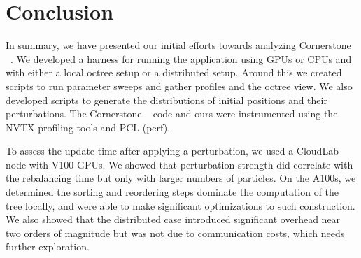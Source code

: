 \section{Conclusion}
\label{sec:conclusion}

In summary, we have presented our initial efforts towards analyzing Cornerstone ~\cite{cornerstone}. We developed a harness for running the application using GPUs or CPUs and with either a local octree setup or a distributed setup. Around this we created scripts to run parameter sweeps and gather profiles and the octree view. We also developed scripts to generate the distributions of initial positions and their perturbations. The Cornerstone ~\cite{cornerstone} code and ours were instrumented using the NVTX profiling tools and PCL (perf). 

To assess the update time after applying a perturbation, we used a CloudLab node with V100 GPUs. We showed that perturbation strength did correlate with the rebalancing time but only with larger numbers of particles. On the A100s, we determined the sorting and reordering steps dominate the computation of the tree locally, and were able to make significant optimizations to such construction. We also showed that the distributed case introduced significant overhead near two orders of magnitude but was not due to communication costs, which needs further exploration.
